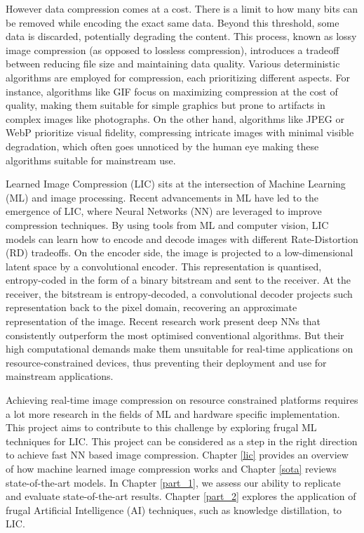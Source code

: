 \documentclass{article}
\begin{document}
However data compression comes at a cost. There is a limit to how many bits can be removed while encoding the exact same data. Beyond this threshold, some data is discarded, potentially degrading the content. This process, known as lossy image compression (as opposed to lossless compression), introduces a tradeoff between reducing file size and maintaining data quality. Various deterministic algorithms are employed for compression, each prioritizing different aspects. For instance, algorithms like GIF focus on maximizing compression at the cost of quality, making them suitable for simple graphics but prone to artifacts in complex images like photographs. On the other hand, algorithms like JPEG or WebP prioritize visual fidelity, compressing intricate images with minimal visible degradation, which often goes unnoticed by the human eye making these algorithms suitable for mainstream use.

Learned Image Compression (LIC) sits at the intersection of Machine Learning (ML) and image processing. Recent advancements in ML have led to the emergence of LIC, where Neural Networks (NN) are leveraged to improve compression techniques. By using tools from ML and computer vision, LIC models can learn how to encode and decode images with different Rate-Distortion (RD) tradeoffs. On the encoder side, the image is projected to a low-dimensional latent space by a convolutional encoder. This representation is quantised, entropy-coded in the form of a binary bitstream and sent to the receiver. At the receiver, the bitstream is entropy-decoded, a convolutional decoder projects such representation back to the pixel domain, recovering an approximate representation of the image. Recent research work present deep NNs that consistently outperform the most optimised conventional algorithms. But their high computational demands make them unsuitable for real-time applications on resource-constrained devices, thus preventing their deployment and use for mainstream applications.

Achieving real-time image compression on resource constrained platforms requires a lot more research in the fields of ML and hardware specific implementation. This project aims to contribute to this challenge by exploring frugal ML techniques for LIC. This project can be considered as a step in the right direction to achieve fast NN based image compression. Chapter \ref{lic} provides an overview of how machine learned image compression works and Chapter \ref{sota} reviews state-of-the-art models. In Chapter \ref{part_1}, we assess our ability to replicate and evaluate state-of-the-art results. Chapter \ref{part_2} explores the application of frugal Artificial Intelligence (AI) techniques, such as knowledge distillation, to LIC.
\end{document}
